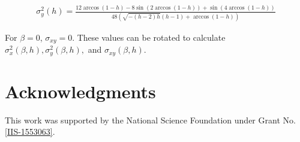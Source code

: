 \documentclass[conference]{IEEEtran}
\begin{document}
{\tiny
\begin{align}
\sigma_y^2(h)=
\frac{12 \arccos(1-h)-8 \sin \left(2 \arccos(1-h)\right)+\sin \left(4 \arccos(1-h)\right)}{48 \left(\sqrt{-(h-2) h} (h-1)+\arccos(1-h)\right)}
\end{align}}

For $\beta = 0$, $\sigma_{xy}=0$. These values can be rotated to calculate $\sigma_x^2(\beta,h),\sigma_y^2(\beta,h),$ and $\sigma_{xy}(\beta,h)$.

\section*{Acknowledgments}
This work was supported by the National Science Foundation under Grant No.\ \href{http://nsf.gov/awardsearch/showAward?AWD_ID=1553063}{ [IIS-1553063]}.


\footnotesize

\end{document}
